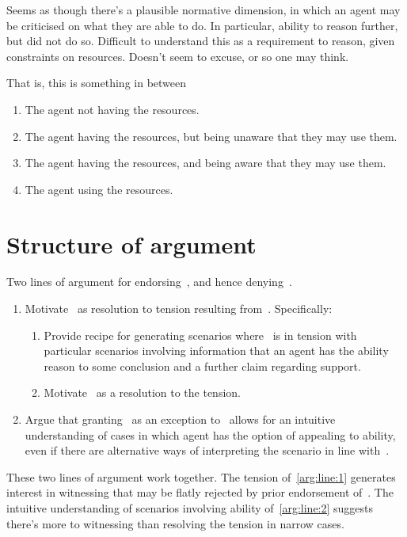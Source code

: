 \begin{note}
  Seems as though there's a plausible normative dimension, in which an agent may be criticised on what they are able to do.
  In particular, ability to reason further, but did not do so.
  Difficult to understand this as a requirement to reason, given constraints on resources.
  Doesn't seem to excuse, or so one may think.

  That is, this is something in between
  \begin{enumerate}
  \item The agent not having the resources.
  \item The agent having the resources, but being unaware that they may use them.
  \item The agent having the resources, and being aware that they may use them.
  \item The agent using the resources.
  \end{enumerate}
\end{note}

\newpage

\section{Structure of argument}
\label{sec:structure-argument}

\begin{note}
  Two lines of argument for endorsing~\rC{}, and hence denying~\uRa{}.
  \begin{enumerate}[label=(L\arabic*), ref=(L\arabic*)]
  \item\label{arg:line:1} Motivate~\rC{} as resolution to tension resulting from~\uRa{}.\newline
    Specifically:
    \begin{enumerate}[label=(L1\alph*)]
    \item\label{arg:line:1:a} Provide recipe for generating scenarios where~\uRa{} is in tension with particular scenarios involving information that an agent has the ability reason to some conclusion and a further claim regarding support.
    \item\label{arg:line:1:b} Motivate~\rC{} as a resolution to the tension.
    \end{enumerate}
  \item\label{arg:line:2} Argue that granting~\rC{} as an exception to~\uRa{} allows for an intuitive understanding of cases in which agent has the option of appealing to ability, even if there are alternative ways of interpreting the scenario in line with~\uRa{}.
  \end{enumerate}
  These two lines of argument work together.
  The tension of~\ref{arg:line:1} generates interest in witnessing that may be flatly rejected by prior endorsement of~\uRa{}.
  The intuitive understanding of scenarios involving ability of~\ref{arg:line:2} suggests there's more to witnessing than resolving the tension in narrow cases.
\end{note}

